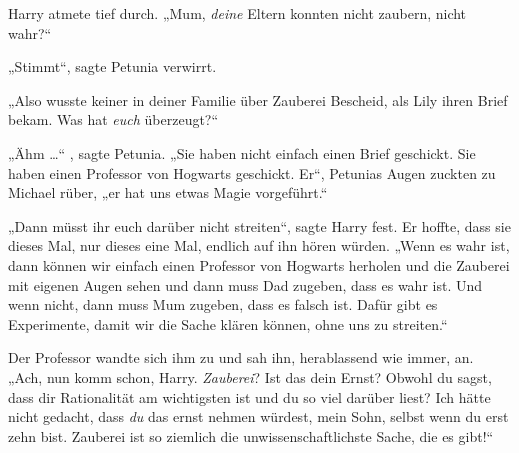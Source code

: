 Harry atmete tief durch.
„Mum, \emph{deine} Eltern konnten nicht zaubern, nicht wahr?“

„Stimmt“, sagte Petunia verwirrt.

„Also wusste keiner in deiner Familie über Zauberei Bescheid, als Lily ihren Brief bekam. Was hat \emph{euch} überzeugt?“

„Ähm …“ , sagte Petunia.
„Sie haben nicht einfach einen Brief geschickt. Sie haben einen Professor von Hogwarts geschickt. Er“, Petunias Augen zuckten zu Michael rüber, „er hat uns etwas Magie vorgeführt.“

„Dann müsst ihr euch darüber nicht streiten“, sagte Harry fest. Er hoffte, dass sie dieses Mal, nur dieses eine Mal, endlich auf ihn hören würden.
„Wenn es wahr ist, dann können wir einfach einen Professor von Hogwarts herholen und die Zauberei mit eigenen Augen sehen und dann muss Dad zugeben, dass es wahr ist. Und wenn nicht, dann muss Mum zugeben, dass es falsch ist. Dafür gibt es Experimente, damit wir die Sache klären können, ohne uns zu streiten.“

Der Professor wandte sich ihm zu und sah ihn, herablassend wie immer, an.
„Ach, nun komm schon, Harry. \emph{Zauberei}? Ist das dein Ernst? Obwohl du sagst, dass dir Rationalität am wichtigsten ist und du so viel darüber liest? Ich hätte nicht gedacht, dass \emph{du} das ernst nehmen würdest, mein Sohn, selbst wenn du erst zehn bist. Zauberei ist so ziemlich die unwissenschaftlichste Sache, die es gibt!“

